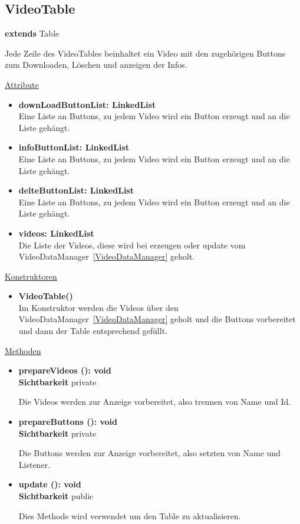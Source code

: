 \newpage
\subsection{VideoTable}\label{VideoTable}
\textbf{extends}  Table \newline

Jede Zeile des VideoTables beinhaltet ein Video mit den zugehörigen Buttons zum Downloaden, Löschen und anzeigen der Infos.

\underline{Attribute}
\begin{itemize}
\itemsep0pt

\item \textbf{downLoadButtonList: LinkedList} \hfill\\ 
Eine Liste an Buttons, zu jedem Video wird ein Button erzeugt und an die Liste gehängt.

\item \textbf{infoButtonList: LinkedList} \hfill\\ 
Eine Liste an Buttons, zu jedem Video wird ein Button erzeugt und an die Liste gehängt.

\item \textbf{delteButtonList: LinkedList} \hfill\\ 
Eine Liste an Buttons, zu jedem Video wird ein Button erzeugt und an die Liste gehängt.

\item \textbf{videos: LinkedList} \hfill\\ 
Die Liste der Videos, diese wird bei erzeugen oder update vom VideoDataManager~\eqref{VideoDataManager} geholt.
\end{itemize}

\underline{Konstruktoren}
\begin{itemize}
\itemsep0pt

\item \textbf{VideoTable()} \hfill\\ 
Im Konstruktor werden die Videos über den VideoDataManager~\eqref{VideoDataManager} geholt und die Buttons vorbereitet und dann der Table entsprechend gefüllt.

\end{itemize}


\underline{Methoden}
\begin{itemize}
\itemsep0pt

\item \textbf{prepareVideos (): void}\hfill\\
\textbf{Sichtbarkeit} private

Die Videos werden zur Anzeige vorbereitet, also trennen von Name und Id.

\item \textbf{prepareButtons (): void}\hfill\\
\textbf{Sichtbarkeit} private

Die Buttons werden zur Anzeige vorbereitet, also setzten von Name und Listener.

\item \textbf{update (): void}\hfill\\
\textbf{Sichtbarkeit} public

Dies Methode wird verwendet um den Table zu aktualisieren.

\end{itemize}